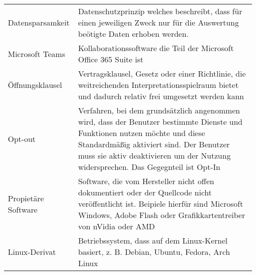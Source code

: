 \renewcommand*{\arraystretch}{1.4}
\begin{longtable}{p{}p{}}

    Datensparsamkeit & Datenschutzprinzip welches beschreibt, dass für einen jeweiligen Zweck nur für die Auswertung beötigte Daten erhoben werden.\\

    Microsoft Teams & Kollaborationssoftware die Teil der Microsoft Office 365 Suite ist\\

    Öffnungsklausel & Vertragsklausel, Gesetz oder einer Richtlinie, die weitreichenden Interpretationsspielraum bietet und dadurch relativ frei umgesetzt werden kann\\

    Opt-out & Verfahren, bei dem grundsätzlich angenommen wird, dass der Benutzer bestimmte Dienste und Funktionen nutzen möchte und diese Standardmäßig aktiviert sind. Der Benutzer muss sie aktiv deaktivieren um der Nutzung widersprechen. Das Gegegnteil ist Opt-In\\

    Propietäre Software & Software, die vom Hersteller nicht offen dokumentiert oder der Quellcode nicht veröffentlicht ist. Beipiele hierfür sind Microsoft Windows, Adobe Flash oder Grafikkartentreiber von nVidia oder AMD\\

    Linux-Derivat & Betriebssystem, dass auf dem Linux-Kernel basiert, z. B. Debian, Ubuntu, Fedora, Arch Linux
\end{longtable}